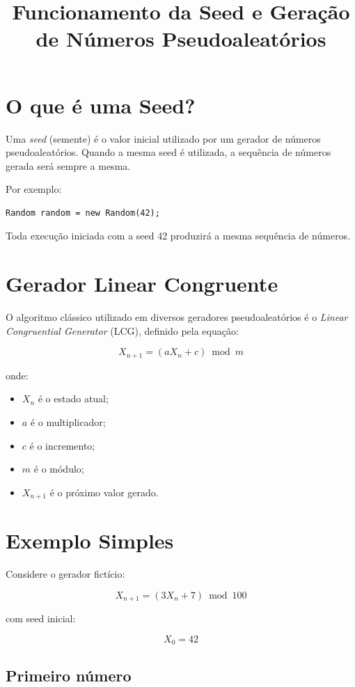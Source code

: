 \documentclass[a4paper,12pt]{article}
\title{Funcionamento da Seed e Geração de Números Pseudoaleatórios}
\author{}
\date{}
\begin{document}
\maketitle

\section{O que é uma Seed?}

Uma \textit{seed} (semente) é o valor inicial utilizado por um gerador de números pseudoaleatórios.
Quando a mesma seed é utilizada, a sequência de números gerada será sempre a mesma.

Por exemplo:

\begin{verbatim}
Random random = new Random(42);
\end{verbatim}

Toda execução iniciada com a seed 42 produzirá a mesma sequência de números.

\section{Gerador Linear Congruente}

O algoritmo clássico utilizado em diversos geradores pseudoaleatórios é o
\textit{Linear Congruential Generator} (LCG), definido pela equação:

\[
X_{n+1} = (aX_n + c) \bmod m
\]

onde:

\begin{itemize}
    \item $X_n$ é o estado atual;
    \item $a$ é o multiplicador;
    \item $c$ é o incremento;
    \item $m$ é o módulo;
    \item $X_{n+1}$ é o próximo valor gerado.
\end{itemize}

\section{Exemplo Simples}

Considere o gerador fictício:

\[
X_{n+1} = (3X_n + 7) \bmod 100
\]

com seed inicial:

\[
X_0 = 42
\]

\subsection*{Primeiro número}
\end{document}
